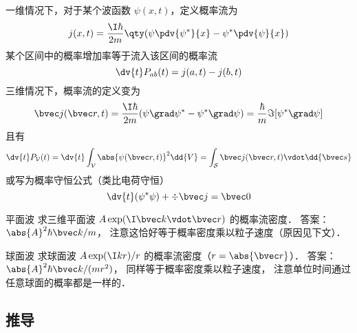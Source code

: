

一维情况下，对于某个波函数 $\psi(x,t)$，定义概率流为
\begin{equation}
j(x,t) = \frac{\I\hbar}{2m} \qty(\psi \pdv{\psi^*}{x} - \psi^* \pdv{\psi}{x})
\end{equation}
某个区间中的概率增加率等于流入该区间的概率流
\begin{equation}
\dv{t} P_{ab}(t) = j(a,t) - j(b,t)
\end{equation}
三维情况下，概率流的定义变为
\begin{equation}
\bvec j(\bvec r,t) = \frac{\I\hbar }{2m} (\psi \grad \psi^* - \psi ^* \grad \psi)
= \frac{\hbar}{m} \Im[\psi^* \grad\psi]
\end{equation}
且有
\begin{equation}
\dv{t} P_\mathcal{V}(t) = \dv{t} \int_\mathcal{V} \abs{\psi (\bvec r,t)}^2 \dd{V}
= \int_\mathcal{S} \bvec j(\bvec r,t) \vdot \dd{\bvec s}
\end{equation}
或写为概率守恒公式（类比电荷守恒） %
\begin{equation}
\dv{t} (\psi^* \psi) + \div\bvec j = \bvec 0
\end{equation}

\begin{exercise}{平面波}
求三维平面波 $A \exp(\I \bvec k \vdot \bvec r)$ 的概率流密度． 答案： $\abs{A}^2 \hbar\bvec k/m$， 注意这恰好等于概率密度乘以粒子速度（原因见下文）．
\end{exercise}

\begin{exercise}{球面波}
求球面波 $A \exp(\I k r)/r$ 的概率流密度（$r = \abs{\bvec r}$）． 答案： $\abs{A}^2 \hbar\bvec k/(mr^2)$， 同样等于概率密度乘以粒子速度， 注意单位时间通过任意球面的概率都是一样的．
\end{exercise}

\subsection{推导}

